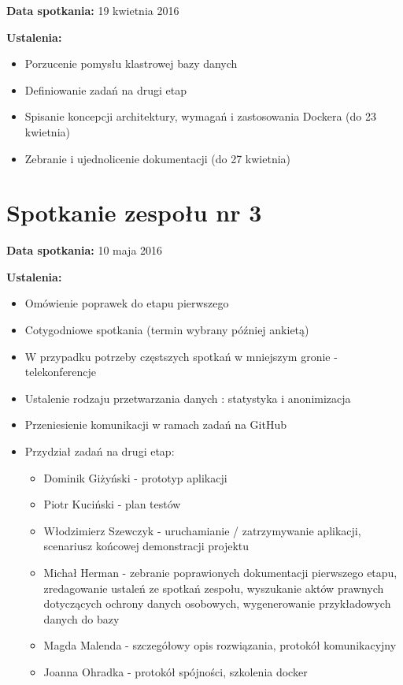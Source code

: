 \textbf{Data spotkania:} 19 kwietnia 2016

\textbf{Ustalenia:}

\begin{itemize}
\item Porzucenie pomysłu klastrowej bazy danych
\item Definiowanie zadań na drugi etap
\item Spisanie koncepcji architektury, wymagań i zastosowania Dockera (do 23 kwietnia)
\item Zebranie i ujednolicenie dokumentacji (do 27 kwietnia)
\end{itemize}


\section{Spotkanie zespołu nr 3}

\textbf{Data spotkania:} 10 maja 2016

\textbf{Ustalenia:}

\begin{itemize}
\item Omówienie poprawek do etapu pierwszego
\item Cotygodniowe spotkania (termin wybrany później ankietą)
\item W przypadku potrzeby częstszych spotkań w mniejszym gronie - telekonferencje
\item Ustalenie rodzaju przetwarzania danych : statystyka i anonimizacja
\item Przeniesienie komunikacji w ramach zadań na GitHub
\item Przydział zadań na drugi etap:
	\begin{itemize}
	\item Dominik Giżyński - prototyp aplikacji
	\item Piotr Kuciński - plan testów
	\item Włodzimierz Szewczyk - uruchamianie / zatrzymywanie aplikacji, scenariusz końcowej demonstracji projektu
	\item Michał Herman - zebranie poprawionych dokumentacji pierwszego etapu, zredagowanie ustaleń ze spotkań zespołu, wyszukanie aktów prawnych dotyczących ochrony danych osobowych, wygenerowanie przykładowych danych do bazy
	\item Magda Malenda - szczegółowy opis rozwiązania, protokół komunikacyjny
	\item Joanna Ohradka - protokół spójności, szkolenia docker
	\end{itemize} 
\end{itemize}

